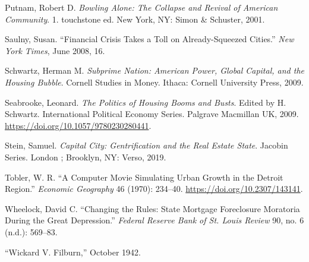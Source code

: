 \documentclass[
]{article}
\begin{document}
\leavevmode\hypertarget{ref-putnam2001bowling}{}%
Putnam, Robert D. \emph{Bowling Alone: The Collapse and Revival of
American Community}. 1. touchstone ed. New York, NY: Simon \& Schuster,
2001.

\leavevmode\hypertarget{ref-saulny2008financial}{}%
Saulny, Susan. ``Financial Crisis Takes a Toll on Already-Squeezed
Cities.'' \emph{New York Times}, June 2008, 16.

\leavevmode\hypertarget{ref-schwartz2009subprime}{}%
Schwartz, Herman M. \emph{Subprime Nation: American Power, Global
Capital, and the Housing Bubble}. Cornell Studies in Money. Ithaca:
Cornell University Press, 2009.

\leavevmode\hypertarget{ref-seabrooke2009politics}{}%
Seabrooke, Leonard. \emph{The Politics of Housing Booms and Busts}.
Edited by H. Schwartz. International Political Economy Series. Palgrave
Macmillan UK, 2009. \url{https://doi.org/10.1057/9780230280441}.

\leavevmode\hypertarget{ref-stein2019capital}{}%
Stein, Samuel. \emph{Capital City: Gentrification and the Real Estate
State}. Jacobin Series. London ; Brooklyn, NY: Verso, 2019.

\leavevmode\hypertarget{ref-tobler1970computer}{}%
Tobler, W. R. ``A Computer Movie Simulating Urban Growth in the Detroit
Region.'' \emph{Economic Geography} 46 (1970): 234--40.
\url{https://doi.org/10.2307/143141}.

\leavevmode\hypertarget{ref-wheelockChangingRulesState2008}{}%
Wheelock, David C. ``Changing the Rules: State Mortgage Foreclosure
Moratoria During the Great Depression.'' \emph{Federal Reserve Bank of
St. Louis Review} 90, no. 6 (n.d.): 569--83.

\leavevmode\hypertarget{ref-1942wickard}{}%
``Wickard V. Filburn,'' October 1942.
\end{document}
